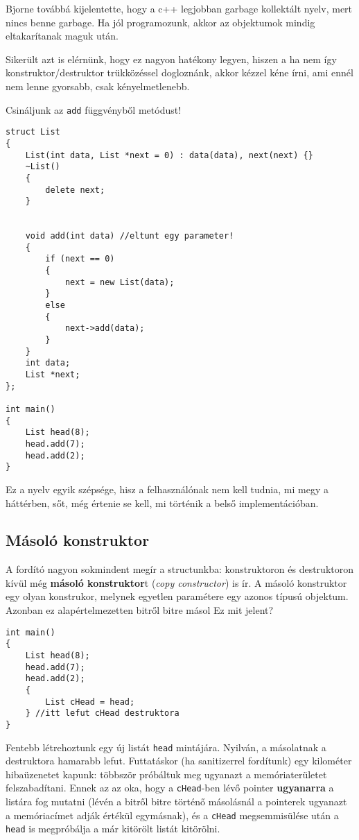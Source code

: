 \documentclass[a4paper,11.5pt]{article}
\begin{document}
	Bjorne továbbá kijelentette, hogy a c++ legjobban garbage kollektált nyelv, mert nincs benne garbage. Ha jól programozunk, akkor az objektumok mindig eltakarítanak maguk után. 
	\medskip
	
	Sikerült azt is elérnünk, hogy ez nagyon hatékony legyen, hiszen a ha nem így konstruktor/destruktor trükközéssel dogloznánk, akkor kézzel kéne írni, ami ennél nem lenne gyorsabb, csak kényelmetlenebb.
	
	\medskip
	Csináljunk az \texttt{add} függvényből metódust!
	\begin{lstlisting}
struct List
{
	List(int data, List *next = 0) : data(data), next(next) {}
	~List()
	{
		delete next;
	}
	
	
	void add(int data) //eltunt egy parameter!
	{
		if (next == 0)
		{
			next = new List(data);
		}
		else
		{
			next->add(data);
		}
	}
	int data;
	List *next;
};

int main()
{
	List head(8);
	head.add(7);
	head.add(2);
}
	\end{lstlisting}
	Ez a nyelv egyik szépsége, hisz a felhasználónak nem kell tudnia, mi megy a háttérben, sőt, még értenie se kell, mi történik a belső implementációban.
	\medskip
	
	\subsection{Másoló konstruktor}
	
	A fordító nagyon sokmindent megír a structunkba: konstruktoron és destruktoron kívül még \textbf{másoló konstruktor}t (\textit{copy constructor}) is ír. A másoló konstruktor egy olyan konstrukor, melynek egyetlen paramétere egy azonos típusú objektum. Azonban ez alapértelmezetten bitről bitre másol Ez mit jelent?
	\begin{lstlisting}
int main()
{
	List head(8);
	head.add(7);
	head.add(2);
	{
		List cHead = head;
	} //itt lefut cHead destruktora
}
	\end{lstlisting}
	Fentebb létrehoztunk egy új listát \texttt{head} mintájára. Nyilván, a másolatnak a destruktora hamarabb lefut. Futtatáskor (ha sanitizerrel fordítunk) egy kilométer hibaüzenetet kapunk: többször próbáltuk meg ugyanazt a memóriaterületet felszabadítani. Ennek az az oka, hogy a \texttt{cHead}-ben lévő pointer \textbf{ugyanarra} a listára fog mutatni (lévén a bitről bitre történő másolásnál a pointerek ugyanazt a memóriacímet adják értékül egymásnak), és a \texttt{cHead} megsemmisülése után a \texttt{head} is megpróbálja a már kitörölt listát kitörölni.
	
\end{document}
